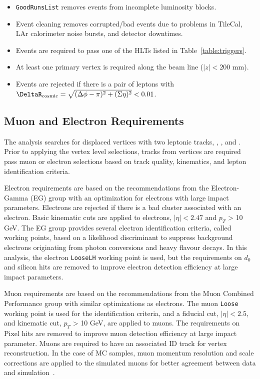 \begin{itemize}
    \item \texttt{GoodRunsList} removes events from incomplete luminosity blocks.
    \item Event cleaning removes corrupted/bad events due to problems in TileCal, LAr calorimeter noise bursts, and detector downtimes.
    \item Events are required to pass one of the HLTs listed in Table~\ref{table:triggers}.
    \item At least one primary vertex is required along the beam line ($|z|<200$ \si{\mm}).
    \item Events are rejected if there is a pair of leptons with $\Rcr = \sqrt{(\Delta \phi - \pi)^{2} + (\Sigma \eta)^{2}} < 0.01$.
\end{itemize}



\subsection{Muon and Electron Requirements}
\label{sec:muon_electron_selection}

The analysis searches for displaced vertices with two leptonic tracks, \mumu, \ee, and \emu. Prior to applying the vertex level selections, tracks from vertices are required pass muon or electron selections based on track quality, kinematics, and lepton identification criteria. 

Electron requirements are based on the recommendations from the Electron-Gamma (EG) group with an optimization for electrons with large impact parameters. Electrons are rejected if there is a bad cluster associated with an electron. Basic kinematic cuts are applied to electrons, $|\eta| < 2.47$ and $p_{T}$ > 10 GeV. The EG group provides several electron identification criteria, called working points, based on a likelihood discriminant to suppress background electrons originating from photon conversions and heavy flavour decays. In this analysis, the electron \texttt{LooseLH} working point is used, but the requirements on $d_{0}$ and silicon hits are removed to improve electron detection efficiency at large impact parameters.

Muon requirements are based on the recommendations from the Muon Combined Performance group with similar optimizations as electrons. The muon \texttt{Loose} working point is used for the identification criteria, and a fiducial cut, $|\eta| < 2.5$, and kinematic cut, $p_{T}$ > 10 GeV, are applied to muons. The requirements on Pixel hits are removed to improve muon detection efficiency at large impact parameter. Muons are required to have an associated ID track for vertex reconstruction. In the case of MC samples, muon momentum resolution and scale corrections are applied to the simulated muons for better agreement between data and simulation~\cite{Aad:2016jkr}.

